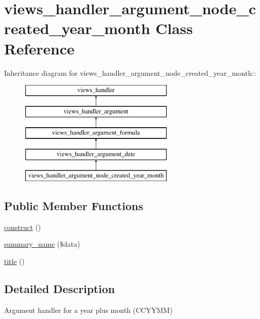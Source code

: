 \hypertarget{classviews__handler__argument__node__created__year__month}{
\section{views\_\-handler\_\-argument\_\-node\_\-created\_\-year\_\-month Class Reference}
\label{classviews__handler__argument__node__created__year__month}
}
Inheritance diagram for views\_\-handler\_\-argument\_\-node\_\-created\_\-year\_\-month::\begin{figure}[H]
\begin{center}
\leavevmode
\includegraphics[height=5cm]{classviews__handler__argument__node__created__year__month}
\end{center}
\end{figure}
\subsection*{Public Member Functions}
\begin{DoxyCompactItemize}
\item 
\hyperlink{classviews__handler__argument__node__created__year__month_a9e090c0caf0a169fe3f9a78160896d01}{construct} ()
\item 
\hyperlink{classviews__handler__argument__node__created__year__month_a05689c48f520a9f0a1dc0008050eae03}{summary\_\-name} (\$data)
\item 
\hyperlink{classviews__handler__argument__node__created__year__month_a80dd9527f548e32a8e8f9279fe0ec3d3}{title} ()
\end{DoxyCompactItemize}


\subsection{Detailed Description}
Argument handler for a year plus month (CCYYMM) 

